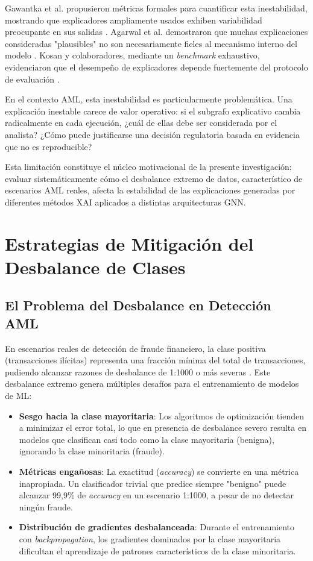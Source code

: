 Gawantka et al. propusieron métricas formales para cuantificar esta inestabilidad, mostrando que explicadores ampliamente usados exhiben variabilidad preocupante en sus salidas \cite{Gawantka2024AExplanations}. Agarwal et al. demostraron que muchas explicaciones consideradas "plausibles" no son necesariamente fieles al mecanismo interno del modelo \cite{Agarwal2022ProbingMethods}. Kosan y colaboradores, mediante un \textit{benchmark} exhaustivo, evidenciaron que el desempeño de explicadores depende fuertemente del protocolo de evaluación \cite{Kosan2023GNNX-BENCH:Benchmarking}.

En el contexto AML, esta inestabilidad es particularmente problemática. Una explicación inestable carece de valor operativo: si el subgrafo explicativo cambia radicalmente en cada ejecución, ¿cuál de ellas debe ser considerada por el analista? ¿Cómo puede justificarse una decisión regulatoria basada en evidencia que no es reproducible?

Esta limitación constituye el núcleo motivacional de la presente investigación: evaluar sistemáticamente cómo el desbalance extremo de datos, característico de escenarios AML reales, afecta la estabilidad de las explicaciones generadas por diferentes métodos XAI aplicados a distintas arquitecturas GNN.

\section{Estrategias de Mitigación del Desbalance de Clases}

\subsection{El Problema del Desbalance en Detección AML}

En escenarios reales de detección de fraude financiero, la clase positiva (transacciones ilícitas) representa una fracción mínima del total de transacciones, pudiendo alcanzar razones de desbalance de 1:1000 o más severas \cite{Rai2025EvaluatingData}. Este desbalance extremo genera múltiples desafíos para el entrenamiento de modelos de ML:

\begin{itemize}
    \item \textbf{Sesgo hacia la clase mayoritaria}: Los algoritmos de optimización tienden a minimizar el error total, lo que en presencia de desbalance severo resulta en modelos que clasifican casi todo como la clase mayoritaria (benigna), ignorando la clase minoritaria (fraude).
    \item \textbf{Métricas engañosas}: La exactitud (\textit{accuracy}) se convierte en una métrica inapropiada. Un clasificador trivial que predice siempre "benigno" puede alcanzar 99,9\% de \textit{accuracy} en un escenario 1:1000, a pesar de no detectar ningún fraude.
    \item \textbf{Distribución de gradientes desbalanceada}: Durante el entrenamiento con \textit{backpropagation}, los gradientes dominados por la clase mayoritaria dificultan el aprendizaje de patrones característicos de la clase minoritaria.
\end{itemize}

